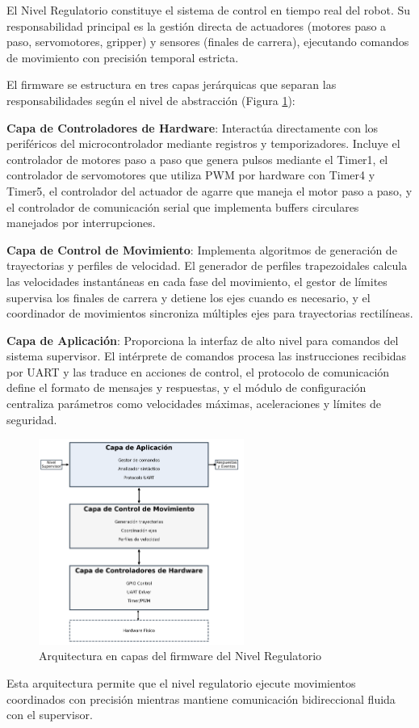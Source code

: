 El Nivel Regulatorio constituye el sistema de control en tiempo real del robot. Su responsabilidad principal es la gestión directa de actuadores (motores paso a paso, servomotores, gripper) y sensores (finales de carrera), ejecutando comandos de movimiento con precisión temporal estricta.

El firmware se estructura en tres capas jerárquicas que separan las responsabilidades según el nivel de abstracción (Figura \ref{fig:arquitectura_regulatorio}):

\textbf{Capa de Controladores de Hardware}: Interactúa directamente con los periféricos del microcontrolador mediante registros y temporizadores. Incluye el controlador de motores paso a paso que genera pulsos mediante el Timer1, el controlador de servomotores que utiliza PWM por hardware con Timer4 y Timer5, el controlador del actuador de agarre que maneja el motor paso a paso, y el controlador de comunicación serial que implementa buffers circulares manejados por interrupciones.

\textbf{Capa de Control de Movimiento}: Implementa algoritmos de generación de trayectorias y perfiles de velocidad. El generador de perfiles trapezoidales calcula las velocidades instantáneas en cada fase del movimiento, el gestor de límites supervisa los finales de carrera y detiene los ejes cuando es necesario, y el coordinador de movimientos sincroniza múltiples ejes para trayectorias rectilíneas.

\textbf{Capa de Aplicación}: Proporciona la interfaz de alto nivel para comandos del sistema supervisor. El intérprete de comandos procesa las instrucciones recibidas por UART y las traduce en acciones de control, el protocolo de comunicación define el formato de mensajes y respuestas, y el módulo de configuración centraliza parámetros como velocidades máximas, aceleraciones y límites de seguridad.

\begin{figure}[H]
    \centering
    \includegraphics[width=0.6\textwidth]{imagenes/arquitectura_regulatorio_capas.png}
    \caption{Arquitectura en capas del firmware del Nivel Regulatorio}
    \label{fig:arquitectura_regulatorio}
\end{figure}

Esta arquitectura permite que el nivel regulatorio ejecute movimientos coordinados con precisión mientras mantiene comunicación bidireccional fluida con el supervisor.
